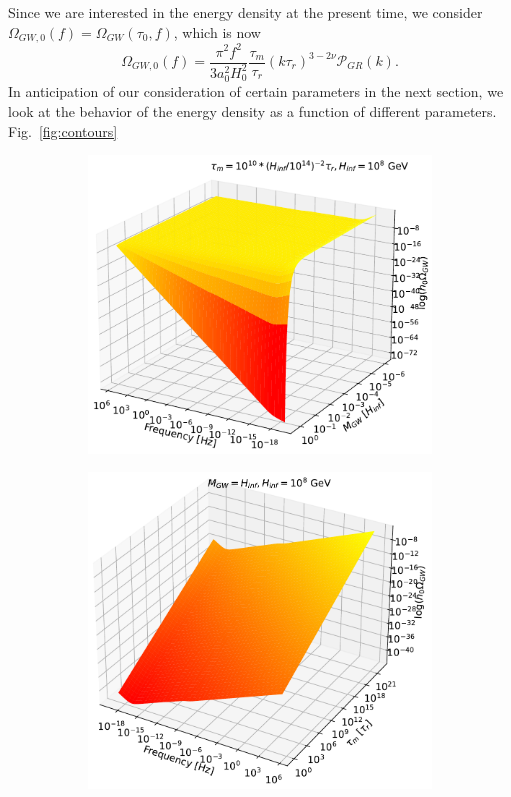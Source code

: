 \documentclass[prd,twocolumn,aps,psfig,nofootinbib,nobibnotes,superscriptaddress,preprintnumbers,times]{revtex4-2}
\begin{document}
Since we are interested in the energy density at the present time, we consider $\Omega_{GW,0}(f) = \Omega_{GW}(\tau_0,f)$, which is now
\begin{equation}\label{eqn:om_gw_0}
    \Omega_{GW,0}(f) = \frac{\pi^2f^2}{3a_0^2 H_0^2}\frac{\tau_m}{\tau_r}(k\tau_r)^{3-2\nu}\mathcal{P}_{GR}(k) .
\end{equation}
In anticipation of our consideration of certain parameters in the next section, we look at the behavior of the energy density as a function of different parameters. Fig.\ \ref{fig:contours}
\begin{figure}[ht!]
\begin{subfigure}{.5\textwidth}
  \centering
  \includegraphics[width=.82\linewidth]{fig/fig4a.pdf}  
  \label{fig:contour-a}
\end{subfigure}
\begin{subfigure}{.5\textwidth}
  \centering
  \includegraphics[width=.82\linewidth]{fig/fig4b.pdf}  

\end{subfigure}
\end{figure}
\end{document}
